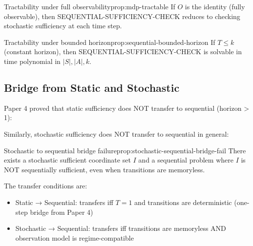 \begin{claim}{Tractability under full observability}{prop:mdp-tractable}
If $O$ is the identity (fully observable), then SEQUENTIAL-SUFFICIENCY-CHECK reduces to checking stochastic sufficiency at each time step.
\end{claim}


\begin{claim}{Tractability under bounded horizon}{prop:sequential-bounded-horizon}
If $T \leq k$ (constant horizon), then SEQUENTIAL-SUFFICIENCY-CHECK is solvable in time polynomial in $|S|, |A|, k$.
\end{claim}


\subsection{Bridge from Static and Stochastic}

Paper 4 proved that static sufficiency does NOT transfer to sequential (horizon > 1):

Similarly, stochastic sufficiency does NOT transfer to sequential in general:

\begin{claim}{Stochastic to sequential bridge failure}{prop:stochastic-sequential-bridge-fail}
There exists a stochastic sufficient coordinate set $I$ and a sequential problem where $I$ is NOT sequentially sufficient, even when transitions are memoryless.
\end{claim}


The transfer conditions are:
\begin{itemize}
\item Static → Sequential: transfers iff $T = 1$ and transitions are deterministic (one-step bridge from Paper 4)
\item Stochastic → Sequential: transfers iff transitions are memoryless AND observation model is regime-compatible
\end{itemize}
